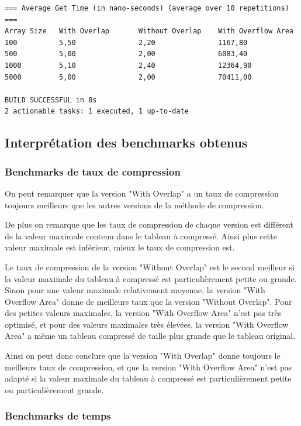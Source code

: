 \documentclass[titlepage]{article}
\begin{document}
{\begin{lstlisting}
=== Average Get Time (in nano-seconds) (average over 10 repetitions) ===
Array Size   With Overlap       Without Overlap    With Overflow Area
100          5,50               2,20               1167,80           
500          5,00               2,00               6083,40           
1000         5,10               2,40               12364,90          
5000         5,00               2,00               70411,00          

BUILD SUCCESSFUL in 8s
2 actionable tasks: 1 executed, 1 up-to-date
\end{lstlisting}
}

\subsection{Interprétation des benchmarks obtenus}

\subsubsection{Benchmarks de taux de compression}

On peut remarquer que la version "With Overlap" a un taux de compression toujours meilleurs que les autres versions de la méthode de compression.
\par De plus on remarque que les taux de compression de chaque version est différent de la valeur maximale contenu dans le tableau à compressé. Ainsi plus cette valeur maximale est inférieur, mieux le taux de compression est.
\par Le taux de compression de la version "Without Overlap" est le second meilleur si la valeur maximale du tableau à compressé est particulièrement petite ou grande. Sinon pour une valeur maximale relativement moyenne, la version "With Overflow Area" donne de meilleurs taux que la version "Without Overlap". Pour des petites valeurs maximales, la version "With Overflow Area" n'est pas très optimisé, et pour des valeurs maximales très élevées, la version "With Overflow Area" a même un tableau compressé de taille plus grande que le tableau original.
\par Ainsi on peut donc conclure que la version "With Overlap" donne toujours le meilleurs taux de compression, et que la version "With Overflow Area" n'est pas adapté si la valeur maximale du tableau à compressé est particulièrement petite ou particulièrement grande. 


\subsubsection{Benchmarks de temps}
\end{document}
